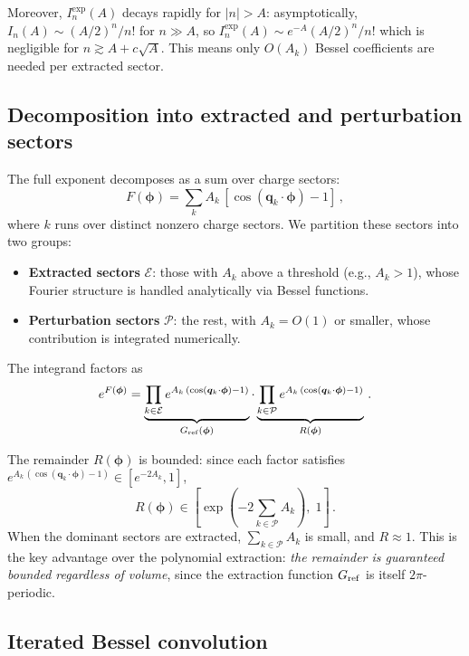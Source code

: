 \documentclass[11pt,a4paper]{article}
\newcommand{\bphi}{\bm{\phi}}
\newcommand{\bq}{\bm{q}}
\begin{document}
Moreover, $I_n^{\exp}(A)$ decays rapidly for $|n| > A$: asymptotically, $I_n(A) \sim (A/2)^n / n!$ for $n \gg A$, so $I_n^{\exp}(A) \sim e^{-A} (A/2)^n / n!$ which is negligible for $n \gtrsim A + c\sqrt{A}$.
This means only $O(A_k)$ Bessel coefficients are needed per extracted sector.

\subsection{Decomposition into extracted and perturbation sectors}
\label{sec:decomposition}

The full exponent decomposes as a sum over charge sectors:
\begin{equation}\label{eq:sector-sum}
  F(\bphi) = \sum_k A_k\,[\cos(\bq_k \cdot \bphi) - 1]\,,
\end{equation}
where $k$ runs over distinct nonzero charge sectors.
We partition these sectors into two groups:
\begin{itemize}
  \item \textbf{Extracted sectors} $\mathcal{E}$: those with $A_k$ above a threshold (e.g., $A_k > 1$), whose Fourier structure is handled analytically via Bessel functions.
  \item \textbf{Perturbation sectors} $\mathcal{P}$: the rest, with $A_k = O(1)$ or smaller, whose contribution is integrated numerically.
\end{itemize}
The integrand factors as
\begin{equation}\label{eq:bessel-factoring}
  e^{F(\bphi)} = \underbrace{\prod_{k \in \mathcal{E}} e^{A_k\,(\cos(\bq_k \cdot \bphi) - 1)}}_{G_{\rm ref}(\bphi)}
  \cdot \underbrace{\prod_{k \in \mathcal{P}} e^{A_k\,(\cos(\bq_k \cdot \bphi) - 1)}}_{R(\bphi)}\,.
\end{equation}

The remainder $R(\bphi)$ is bounded:
since each factor satisfies $e^{A_k\,(\cos(\bq_k \cdot \bphi) - 1)} \in [e^{-2A_k}, 1]$,
\begin{equation}\label{eq:remainder-bounded}
  R(\bphi) \in \left[\exp\!\left(-2\sum_{k \in \mathcal{P}} A_k\right),\; 1\right]\,.
\end{equation}
When the dominant sectors are extracted, $\sum_{k \in \mathcal{P}} A_k$ is small, and $R \approx 1$.
This is the key advantage over the polynomial extraction: \emph{the remainder is guaranteed bounded regardless of volume}, since the extraction function $G_{\rm ref}$ is itself $2\pi$-periodic.

\subsection{Iterated Bessel convolution}
\label{sec:iterated-convolution}
\end{document}
